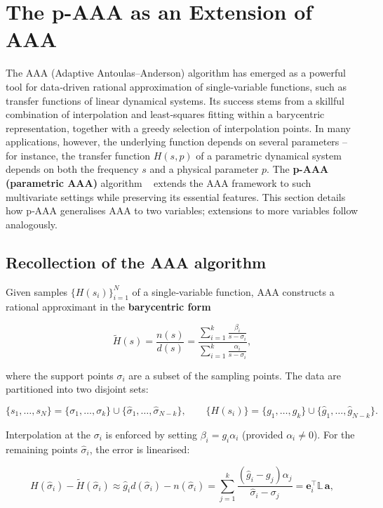 \documentclass{article}
\begin{document}
\section{The p-AAA as an Extension of AAA}

The AAA (Adaptive Antoulas–Anderson) algorithm has emerged as a powerful tool for data‑driven rational approximation of single‑variable functions, such as transfer functions of linear dynamical systems. Its success stems from a skillful combination of interpolation and least‑squares fitting within a barycentric representation, together with a greedy selection of interpolation points. In many applications, however, the underlying function depends on several parameters – for instance, the transfer function \(H(s,p)\) of a parametric dynamical system depends on both the frequency \(s\) and a physical parameter \(p\). The \textbf{p-AAA (parametric AAA)} algorithm ~\cite{ref3} extends the AAA framework to such multivariate settings while preserving its essential features. This section details how p‑AAA generalises AAA to two variables; extensions to more variables follow analogously.

\subsection{Recollection of the AAA algorithm}

Given samples \(\{H(s_i)\}_{i=1}^{N}\) of a single‑variable function, AAA constructs a rational approximant in the \textbf{barycentric form}

\[
\tilde{H}(s)=\frac{n(s)}{d(s)}=\frac{\sum_{i=1}^{k}\frac{\beta_i}{s-\sigma_i}}
{\sum_{i=1}^{k}\frac{\alpha_i}{s-\sigma_i}},
\tag{2.2}
\]

where the support points \(\sigma_i\) are a subset of the sampling points.  
The data are partitioned into two disjoint sets:

\[
\{s_1,\dots,s_N\}=\{\sigma_1,\dots,\sigma_k\}\cup\{\hat\sigma_1,\dots,\hat\sigma_{N-k}\},\qquad
\{H(s_i)\}=\{g_1,\dots,g_k\}\cup\{\hat g_1,\dots,\hat g_{N-k}\}.
\]

Interpolation at the \(\sigma_i\) is enforced by setting \(\beta_i=g_i\alpha_i\) (provided \(\alpha_i\neq0\)).  
For the remaining points \(\hat\sigma_i\), the error is linearised:

\[
H(\hat\sigma_i)-\tilde{H}(\hat\sigma_i)\approx
\hat g_i d(\hat\sigma_i)-n(\hat\sigma_i)
=\sum_{j=1}^{k}\frac{(\hat g_i-g_j)\alpha_j}{\hat\sigma_i-\sigma_j}
=\mathbf{e}_i^{\top}\mathbb{L}\,\mathbf{a},
\tag{2.9}
\]
\end{document}
